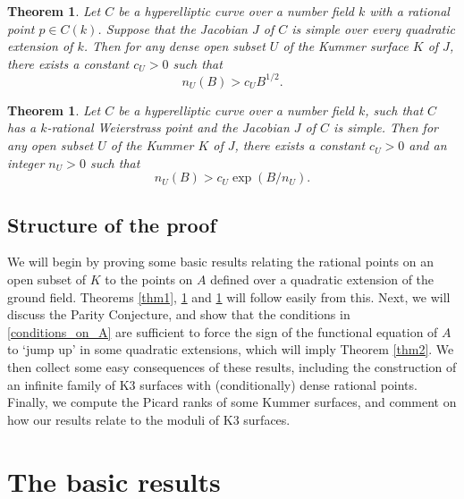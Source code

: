 \documentclass[a4paper,12pt]{amsart}
\newtheorem{theorem}[definition]{Theorem}
\begin{document}
\begin{theorem}\label{thm:uncon1}
Let $C$ be a hyperelliptic curve over a number field $k$ with a rational point $p \in C(k)$. Suppose that the Jacobian $J$ of $C$ is simple over every quadratic extension of $k$. Then for any dense open subset $U$ of the Kummer surface $K$ of $J$, there exists a constant $c_U >0$ such that
\begin{equation}
n_{U}(B) > c_U B^{{1/2}}. 
\end{equation}
\end{theorem}

\begin{theorem}\label{thm:uncon2}
Let $C$ be a hyperelliptic curve over a number field $k$, such that $C$ has a $k$-rational Weierstrass point and the Jacobian $J$ of $C$ is simple. Then for any open subset $U$ of the Kummer $K$ of $J$, there exists a constant $c_U>0$ and an integer $n_U>0$ such that
\begin{equation}
n_U(B) >c_U \exp(B/n_U). 
\end{equation}
\end{theorem}

\subsection{Structure of the proof}
We will begin by proving some basic results relating the rational points on an open subset of $K$ to the points on $A$ defined over a quadratic extension of the ground field. Theorems \ref{thm1}, \ref{thm:uncon1} and \ref{thm:uncon2} will follow easily from this. Next, we will discuss the Parity Conjecture, and show that the conditions in \ref{conditions_on_A} are sufficient to force the sign of the functional equation of $A$ to `jump up' in some quadratic extensions, which will imply Theorem \ref{thm2}. 
We then collect some easy consequences of these results, including the construction of an infinite family of K3 surfaces with (conditionally) dense rational points. Finally, we compute the Picard ranks of some Kummer surfaces, and comment on how our results relate to the moduli of K3 surfaces. 

\section{The basic results}
\end{document}

